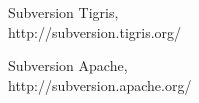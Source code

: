 \documentclass[11pt]{scrartcl}
\begin{document}
\begin{thebibliography}{9}

  Subversion Tigris,\\
  http://subversion.tigris.org/

  Subversion Apache,\\
  http://subversion.apache.org/

\end{thebibliography}
\end{document}
